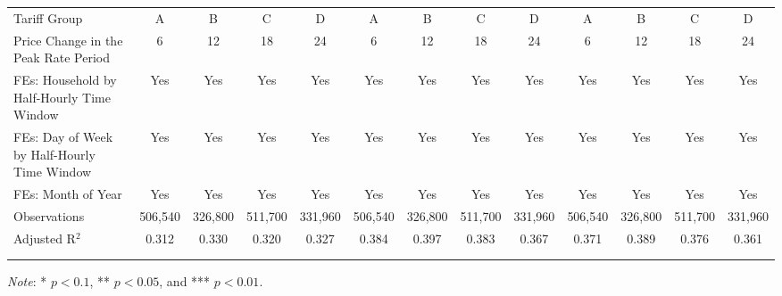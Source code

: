 {\begin{sidewaystable}[t!]
\begin{adjustbox}{scale = 1.00}
\begin{threeparttable}
\begin{tabular}{@{\extracolsep{1pt}}lcccccccccccc}
                    Tariff Group & A & B & C & D & A & B & C & D & A & B & C & D \\
                    Price Change in the Peak Rate Period & 6 & 12 & 18 & 24 & 6 & 12 & 18 & 24 & 6 & 12 & 18 & 24 \\
                    FEs: Household by Half-Hourly Time Window & Yes & Yes & Yes & Yes & Yes & Yes & Yes & Yes & Yes & Yes & Yes & Yes \\
                    FEs: Day of Week by Half-Hourly Time Window & Yes & Yes & Yes & Yes & Yes & Yes & Yes & Yes & Yes & Yes & Yes & Yes \\
                    FEs: Month of Year & Yes & Yes & Yes & Yes & Yes & Yes & Yes & Yes & Yes & Yes & Yes & Yes \\
                    Observations & 506,540 & 326,800 & 511,700 & 331,960 & 506,540 & 326,800 & 511,700 & 331,960 & 506,540 & 326,800 & 511,700 & 331,960 \\
                    Adjusted R$^{2}$ & 0.312 & 0.330 & 0.320 & 0.327 & 0.384 & 0.397 & 0.383 & 0.367 & 0.371 & 0.389 & 0.376 & 0.361 \\
                    \\[-2.0ex]
                    \hline \hline
                    \\[-4.5ex]
                \end{tabular}
                \begin{tablenotes}[flushleft]
                    \footnotesize
                    \item \textit{Note}: * $p < 0.1$, ** $p < 0.05$, and *** $p < 0.01$.
                \end{tablenotes}
            \end{threeparttable}
        \end{adjustbox}
    \end{sidewaystable}
}
